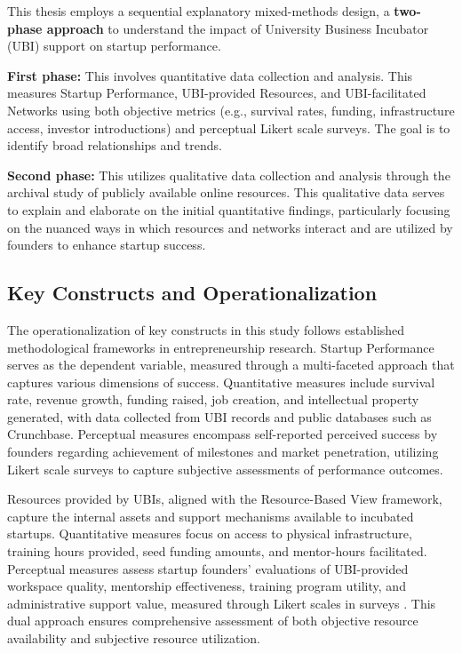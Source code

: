 \documentclass[../Main.tex]{subfiles}
\begin{document}
    \begin{condensed_idea}
        This thesis employs a sequential explanatory mixed-methods design, a \textbf{two-phase approach} to understand the impact of University Business Incubator (UBI) support on startup performance.
    
        \textbf{First phase:} This involves quantitative data collection and analysis. This measures Startup Performance, UBI-provided Resources, and UBI-facilitated Networks using both objective metrics (e.g., survival rates, funding, infrastructure access, investor introductions) and perceptual Likert scale surveys. The goal is to identify broad relationships and trends.
    
        \textbf{Second phase:} This utilizes qualitative data collection and analysis through the archival study of publicly available online resources. This qualitative data serves to explain and elaborate on the initial quantitative findings, particularly focusing on the nuanced ways in which resources and networks interact and are utilized by founders to enhance startup success.
    \end{condensed_idea}

    \subsection{Key Constructs and Operationalization}
    The operationalization of key constructs in this study follows established methodological frameworks in entrepreneurship research. Startup Performance serves as the dependent variable, measured through a multi-faceted approach that captures various dimensions of success. Quantitative measures include survival rate, revenue growth, funding raised, job creation, and intellectual property generated, with data collected from UBI records and public databases such as Crunchbase. Perceptual measures encompass self-reported perceived success by founders regarding achievement of milestones and market penetration, utilizing Likert scale surveys to capture subjective assessments of performance outcomes.

    Resources provided by UBIs, aligned with the Resource-Based View framework, capture the internal assets and support mechanisms available to incubated startups. Quantitative measures focus on access to physical infrastructure, training hours provided, seed funding amounts, and mentor-hours facilitated. Perceptual measures assess startup founders' evaluations of UBI-provided workspace quality, mentorship effectiveness, training program utility, and administrative support value, measured through Likert scales in surveys \cite{mian1996assessing}. This dual approach ensures comprehensive assessment of both objective resource availability and subjective resource utilization.
\end{document}
